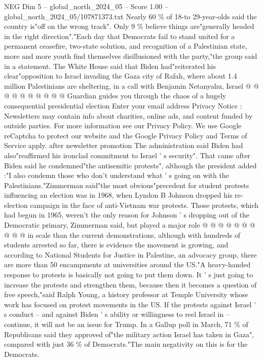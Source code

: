 \begin{textsample}{NEG Dim 5 – global\_north\_2024\_05 – Score 1.00 – global\_north\_2024\_05/107871373.txt}
Nearly 60 \% of 18-to 29-year-olds said the country is"off on the wrong track".
Only 9 \% believe things are"generally headed in the right direction"."Each day that Democrats fail to stand united for a permanent ceasefire, two-state solution, and recognition of a Palestinian state, more and more youth find themselves disillusioned with the party,"the group said in a statement.
The White House said that Biden had"reiterated his clear"opposition to Israel invading the Gaza city of Rafah, where about 1.4 million Palestinians are sheltering, in a call with Benjamin Netanyahu, Israel @ @ @ @ @ @ @ @ @ @ Guardian guides you through the chaos of a hugely consequential presidential election Enter your email address Privacy Notice : Newsletters may contain info about charities, online ads, and content funded by outside parties.
For more information see our Privacy Policy.
We use Google reCaptcha to protect our website and the Google Privacy Policy and Terms of Service apply. after newsletter promotion The administration said Biden had also"reaffirmed his ironclad commitment to Israel ' s security".
That came after Biden said he condemned"the antisemitic protests", although the president added :"I also condemn those who don't understand what ' s going on with the Palestinians."Zimmerman said"the most obvious"precedent for student protests influencing an election was in 1968, when Lyndon B Johnson dropped his re-election campaign in the face of anti-Vietnam war protests.
Those protests, which had begun in 1965, weren't the only reason for Johnson ' s dropping out of the Democratic primary, Zimmerman said, but played a major role @ @ @ @ @ @ @ @ @ @ in scale than the current demonstrations, although with hundreds of students arrested so far, there is evidence the movement is growing, and according to National Students for Justice in Palestine, an advocacy group, there are more than 50 encampments at universities around the US."A heavy-handed response to protests is basically not going to put them down.
It ' s just going to increase the protests and strengthen them, because then it becomes a question of free speech,"said Ralph Young, a history professor at Temple University whose work has focused on protest movements in the US.
If the protests against Israel ' s conduct -- and against Biden ' s ability or willingness to reel Israel in -- continue, it will not be an issue for Trump.
In a Gallup poll in March, 71 \% of Republicans said they approved of"the military action Israel has taken in Gaza", compared with just 36 \% of Democrats."The main negativity on this is for the Democrats.

\end{textsample}
